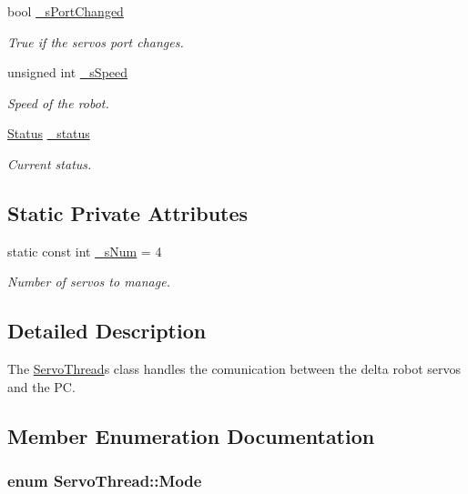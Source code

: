 \begin{DoxyCompactItemize}
bool \hyperlink{a00009_a6e803432db01b10ed975132315280fd3}{\+\_\+s\+Port\+Changed}
\begin{DoxyCompactList}\small\item\em True if the servos port changes. \end{DoxyCompactList}\item 
unsigned int \hyperlink{a00009_a2591c704c80518be7abb1698364cab5e}{\+\_\+s\+Speed}
\begin{DoxyCompactList}\small\item\em Speed of the robot. \end{DoxyCompactList}\item 
\hyperlink{a00009_a3c23985ab5e94c14f5e6fca0a9338f9c}{Status} \hyperlink{a00009_a8d2299f41165bffe1656df776f7f7528}{\+\_\+status}
\begin{DoxyCompactList}\small\item\em Current status. \end{DoxyCompactList}\end{DoxyCompactItemize}
\subsection*{Static Private Attributes}
\begin{DoxyCompactItemize}
\item 
static const int \hyperlink{a00009_a334e0c5bca9ccb2585cb82bce60ea42f}{\+\_\+s\+Num} = 4
\begin{DoxyCompactList}\small\item\em Number of servos to manage. \end{DoxyCompactList}\end{DoxyCompactItemize}


\subsection{Detailed Description}
The \hyperlink{a00009}{Servo\+Thread}\textquotesingle{}s class handles the comunication between the delta robot servos and the P\+C. 



\subsection{Member Enumeration Documentation}
\hypertarget{a00009_a8d581034e60792a9995d44065f6140a5}{}
\subsubsection[{Mode}]{\setlength{\rightskip}{0pt plus 5cm}enum {\bf Servo\+Thread\+::\+Mode}}\label{a00009_a8d581034e60792a9995d44065f6140a5}


